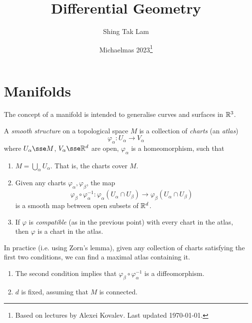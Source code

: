 \documentclass{article}
\title{Differential Geometry}
\author{Shing Tak Lam}
\date{Michaelmas 2023\footnote{Based on lectures by Alexei Kovalev. Last updated \today.}}
\begin{document}
\maketitle

\tableofcontents

\lec


\section{Manifolds}

The concept of a manifold is intended to generalise curves and surfaces in \(\mathbb{R}^3\).


\begin{definition}
    A \emph{smooth structure} on a topological space \(M\) is a collection of \emph{charts} (an \emph{atlas})
    \[\varphi_\alpha : U_\alpha \to V_\alpha\]
    where \(U_\alpha \sse M\), \(V_\alpha \sse \R^d\) are open, \(\varphi_\alpha\) is a homeomorphism, such that
    \begin{enumerate}
        \item \(M = \bigcup_\alpha U_\alpha\). That is, the charts cover \(M\).
        \item Given any charts \(\varphi_\alpha, \varphi_\beta\), the map
        \[\varphi_\beta \circ \varphi_\alpha^{-1} : \varphi_\alpha(U_\alpha \cap U_\beta) \to \varphi_\beta(U_\alpha \cap U_\beta)\]
        is a smooth map between open subsets of \(\mathbb{R}^d\).
        \item If \(\varphi\) is \emph{compatible} (as in the previous point) with every chart in the atlas, then \(\varphi\) is a chart in the atlas.
    \end{enumerate}
\end{definition}

In practice (i.e. using Zorn's lemma), given any collection of charts satisfying the first two conditions, we can find a maximal atlas containing it.

\begin{remark}
    \begin{enumerate}
        \item The second condition implies that \(\varphi_\beta\circ \varphi_\alpha^{-1}\) is a diffeomorphism.
        \item \(d\) is fixed, assuming that \(M\) is connected.
    \end{enumerate}
\end{remark}
\end{document}

